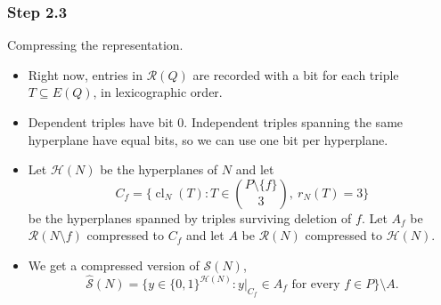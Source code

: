 \documentclass{beamer}
\newcommand{\HH}{\mathcal H}
\newcommand{\RR}{\mathcal R}
\newcommand{\cl}{\operatorname{cl}}
\begin{document}
\begin{frame}
  \frametitle{Step 2.3}
  Compressing the representation.
  \begin{itemize}
    \item Right now, entries in $\RR(Q)$ are recorded with a bit for
      each triple $T\subseteq E(Q)$, in lexicographic order.
    \item Dependent triples have bit $0$. Independent triples
      spanning the same hyperplane have equal bits, so we can use
      one bit per hyperplane.
    \item Let $\HH(N)$ be the hyperplanes of $N$ and let
      \[
        C_f=\{\cl_N(T):T\in\binom{P\setminus\{f\}}3,\ r_N(T)=3\}
      \]
      be the hyperplanes spanned by triples surviving deletion of $f$.
      Let $A_f$ be $\RR(N\setminus f)$ compressed to $C_f$ and
      let $A$ be $\RR(N)$ compressed to $\HH(N)$.
    \item We get a compressed version of $\mathcal S(N)$,
      \[
        \widehat{\mathcal S}(N)=
        \{y\in\{0,1\}^{\HH(N)}:y|_{C_f}\in A_f
          \text{ for every }f\in P\}\setminus A.
      \]
  \end{itemize}
\end{frame}
\end{document}
